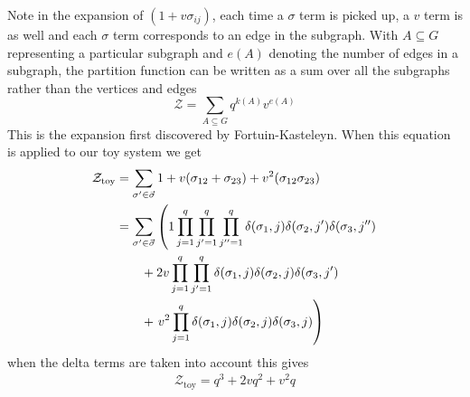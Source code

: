 Note in the expansion of $(1 + v \sigma_{ij})$, each time a $\sigma$ term is picked up, a $v$ term is as well and each $\sigma$ term corresponds to an edge in the subgraph. With $A \subseteq G$ representing a particular subgraph and $e(A)$ denoting the number of edges in a subgraph, the partition function can be written as a sum over all the subgraphs rather than the vertices and edges
\begin{equation}
\mathcal{Z} = \sum_{A \subseteq G} q^{k(A)} v^{e(A)}
\end{equation}
This is the expansion first discovered by Fortuin-Kasteleyn.\cite{kasteleyn_1969} When this equation is applied to our toy system we get
%
{ \allowdisplaybreaks
\begin{align}
\mathcal{Z}_\text{toy} 
&= 
\sum_{\sigma ' \in \vec \sigma} 1 + v(\sigma_{12} + \sigma_{23}) + v^2 (\sigma_{12} \sigma_{23})
\\ \notag &=
\sum_{\sigma ' \in \vec \sigma} \left (
1 \prod_{j=1}^q \prod_{j'=1}^q \prod_{j''=1}^q \delta(\sigma_1, j) \delta(\sigma_2, j') \delta(\sigma_3, j'') \right.
\\ \notag
&\hspace{2em} + 2 v \prod_{j=1}^q \prod_{j'=1}^q \delta(\sigma_1, j) \delta(\sigma_2, j) \delta(\sigma_3, j')  
\\ \notag 
&\hspace{2em} + \left. 
v^2 \prod_{j=1}^q \delta(\sigma_1, j) \delta(\sigma_2, j) \delta(\sigma_3, j)  \right )
\end{align}
}
%
when the delta terms are taken into account this gives
\begin{align}
\mathcal{Z}_\text{toy} = q^3 + 2 v q^2 + v^2 q
\end{align}

